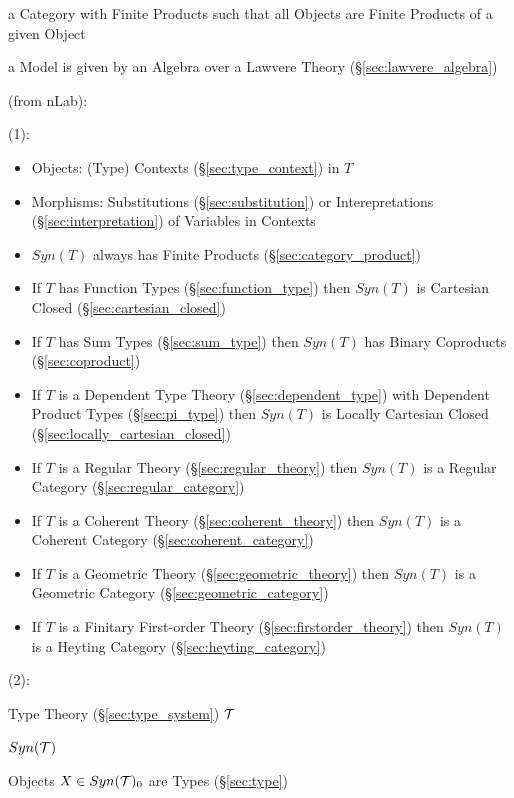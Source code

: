 a Category with Finite Products such
that all Objects are Finite Products of a given Object %

a Model is given by an Algebra over a Lawvere Theory
(\S\ref{sec:lawvere_algebra})


(from nLab):

(1):

\begin{itemize}
  \item Objects: (Type) Contexts (\S\ref{sec:type_context}) in $T$
  \item Morphisms: Substitutions (\S\ref{sec:substitution}) or
    Interepretations (\S\ref{sec:interpretation}) of Variables in
    Contexts
\end{itemize}

\begin{itemize}
  \item $Syn(T)$ always has Finite Products
    (\S\ref{sec:category_product})
  \item If $T$ has Function Types (\S\ref{sec:function_type}) then
    $Syn(T)$ is Cartesian Closed (\S\ref{sec:cartesian_closed})
  \item If $T$ has Sum Types (\S\ref{sec:sum_type}) then $Syn(T)$ has
    Binary Coproducts (\S\ref{sec:coproduct})
  \item If $T$ is a Dependent Type Theory (\S\ref{sec:dependent_type})
    with Dependent Product Types (\S\ref{sec:pi_type}) then $Syn(T)$
    is Locally Cartesian Closed (\S\ref{sec:locally_cartesian_closed})
  \item If $T$ is a Regular Theory (\S\ref{sec:regular_theory}) then
    $Syn(T)$ is a Regular Category (\S\ref{sec:regular_category})
  \item If $T$ is a Coherent Theory (\S\ref{sec:coherent_theory}) then
    $Syn(T)$ is a Coherent Category (\S\ref{sec:coherent_category})
  \item If $T$ is a Geometric Theory (\S\ref{sec:geometric_theory}) then
    $Syn(T)$ is a Geometric Category (\S\ref{sec:geometric_category})
  \item If $T$ is a Finitary First-order Theory
    (\S\ref{sec:firstorder_theory}) then $Syn(T)$ is a Heyting
    Category (\S\ref{sec:heyting_category})
\end{itemize}

(2):

Type Theory (\S\ref{sec:type_system}) $\mathcal{T}$

$Syn(\mathcal{T})$

Objects $X \in Syn(\mathcal{T})_0$ are Types (\S\ref{sec:type})

